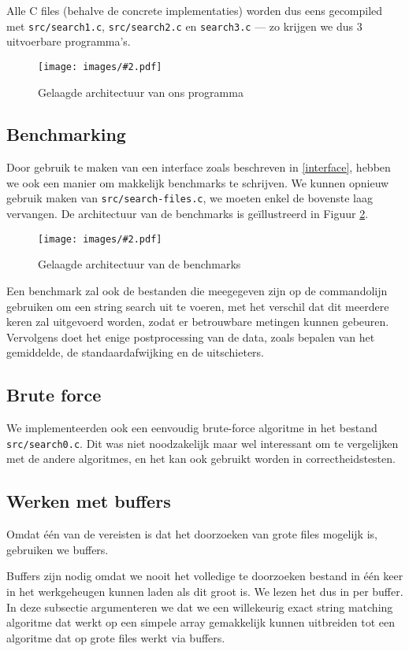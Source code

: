 \documentclass[a4paper,11pt]{article}
\newcommand{\image}[3][1]{
    \begin{figure}
    \begin{center}
    \texttt{[image: images/\#2.pdf]}
    \caption{#3}
    \label{fig:#2}
    \end{center}
    \end{figure}
}
\begin{document}
Alle C files (behalve de concrete implementaties) worden dus eens gecompiled met
\verb#src/search1.c#, \verb#src/search2.c# en \verb#search3.c# — zo krijgen we
dus 3 uitvoerbare programma's.

\image[0.6]{layers-main}{Gelaagde architectuur van ons programma}

\subsection{Benchmarking}

Door gebruik te maken van een interface zoals beschreven in \ref{interface},
hebben we ook een manier om makkelijk benchmarks te schrijven. We kunnen opnieuw
gebruik maken van \verb#src/search-files.c#, we moeten enkel de bovenste laag
vervangen. De architectuur van de benchmarks is ge\"illustreerd in Figuur
\ref{fig:layers-bench}.

\image[0.6]{layers-bench}{Gelaagde architectuur van de benchmarks}

Een benchmark zal ook de bestanden die meegegeven zijn op de commandolijn
gebruiken om een string search uit te voeren, met het verschil dat dit meerdere
keren zal uitgevoerd worden, zodat er betrouwbare metingen kunnen gebeuren.
Vervolgens doet het enige postprocessing van de data, zoals bepalen van het
gemiddelde, de standaardafwijking en de uitschieters.

\subsection{Brute force}
\label{brute-force}

We implementeerden ook een eenvoudig brute-force algoritme in het bestand
\verb#src/search0.c#. Dit was niet noodzakelijk maar wel interessant om te
vergelijken met de andere algoritmes, en het kan ook gebruikt worden in
correctheidstesten.

\subsection{Werken met buffers}
\label{buffers}

Omdat \'e\'en van de vereisten is dat het doorzoeken van grote files mogelijk
is, gebruiken we buffers.

Buffers zijn nodig omdat we nooit het volledige te doorzoeken bestand in \'e\'en
keer in het werkgeheugen kunnen laden als dit groot is. We lezen het dus in per
buffer. In deze subsectie argumenteren we dat we een willekeurig exact string
matching algoritme dat werkt op een simpele array gemakkelijk kunnen uitbreiden
tot een algoritme dat op grote files werkt via buffers.
\end{document}
